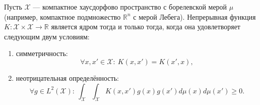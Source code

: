 \begin{theorem}[Мерсер]
Пусть $\mathcal{X}$ --- компактное хаусдорфово пространство с борелевской мерой $\mu$ (например, компактное подмножество $\mathbb{R}^n$ с мерой Лебега). Непрерывная функция $K \colon \mathcal{X} \times \mathcal{X} \to \mathbb{R}$ является ядром тогда и только тогда, когда она удовлетворяет следующим двум условиям:
\begin{enumerate}
    \item симметричность: \[ \forall x, x' \in \mathcal{X}: \ K(x, x') = K(x', x), \]
    \item неотрицательная определённость: \[ \forall g \in L^2(\mathcal{X}): \ \int_\mathcal{X} \int_\mathcal{X} K(x, x') g(x) g(x') d\mu(x) d\mu(x') \ge 0. \]
\end{enumerate}
\end{theorem}
